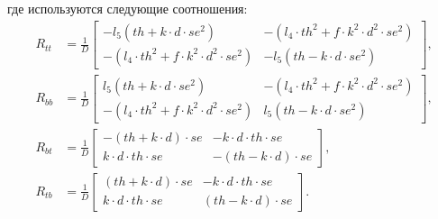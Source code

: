 \begin{frame}
    где используются следующие соотношения:
    \begin{equation*}
        \begin{split}
            R_{tt} & = \frac{1}{D} \left[\begin{array}{cc}
                - l_{5}(th + k \cdot d \cdot se^{2}) & - (l_{4}\cdot th^{2} + f\cdot k^{2} \cdot d^{2} \cdot se^{2})\\
                - (l_{4}\cdot th^{2} + f\cdot k^{2} \cdot d^{2} \cdot se^{2})  & - l_{5}(th - k \cdot d \cdot se^{2}) 
            \end{array}\right],\\
            R_{bb} & = \frac{1}{D} \left[\begin{array}{cc}
                l_{5}(th + k \cdot d \cdot se^{2}) & - (l_{4}\cdot th^{2} + f\cdot k^{2} \cdot d^{2} \cdot se^{2}) \\
                - (l_{4}\cdot th^{2} + f\cdot k^{2} \cdot d^{2} \cdot se^{2})  & l_{5}(th - k \cdot d \cdot se^{2})
            \end{array}\right],\\
            R_{bt} & = \frac{1}{D} \left[\begin{array}{cc}
                - (th + k \cdot d)\cdot se & - k \cdot d \cdot th \cdot se \\
                k \cdot d \cdot th \cdot se & - (th - k \cdot d)\cdot se 
            \end{array}\right],\\
            R_{tb} & = \frac{1}{D} \left[\begin{array}{cc}
                (th + k \cdot d)\cdot se & - k \cdot d \cdot th \cdot se \\
                k \cdot d \cdot th \cdot se & (th - k \cdot d)\cdot se  
            \end{array}\right].\\
        \end{split}
    \end{equation*}
\end{frame}

